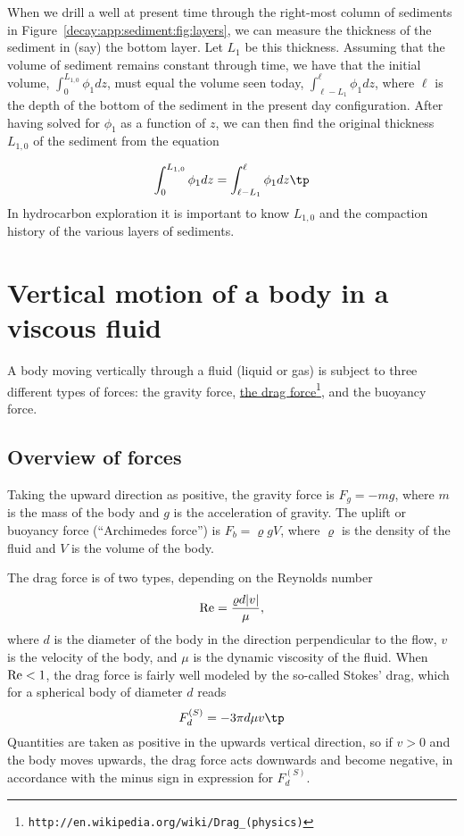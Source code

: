 \documentclass[graybox,sectrefs,envcountresetchap,open=right,final]{svmonodo}
\begin{document}
When we drill a well at present time through the right-most column of
sediments in Figure~\ref{decay:app:sediment:fig:layers}, we can measure
the thickness of the sediment in (say) the bottom layer. Let $L_1$ be
this thickness.  Assuming that the volume of sediment remains constant
through time, we have that the initial volume, $\int_0^{L_{1,0}}
\phi_1 dz$, must equal the volume seen today,
$\int_{\ell-L_1}^{\ell}\phi_1 dz$, where $\ell$ is the depth of the
bottom of the sediment in the present day configuration.  After having
solved for $\phi_1$ as a function of $z$, we can then find the
original thickness $L_{1,0}$ of the sediment from the equation

\[ \int_0^{L_{1,0}} \phi_1 dz = \int_{\ell-L_1}^{\ell}\phi_1 dz \tp \]
In hydrocarbon exploration it is important to know $L_{1,0}$ and the
compaction history of the various layers of sediments.

\section{Vertical motion of a body in a viscous fluid}
\label{decay:app:drag}


A body moving vertically through a fluid (liquid or gas) is subject to
three different types of forces: the gravity force, \href{{http://en.wikipedia.org/wiki/Drag_(physics)}}{the drag force}\footnote{\texttt{http://en.wikipedia.org/wiki/Drag\_(physics)}},
and the buoyancy force.

\subsection{Overview of forces}

Taking the upward direction as positive,
the gravity force is $F_g= -mg$, where $m$ is the mass of the body and
$g$ is the acceleration of gravity.
The uplift or buoyancy force (``Archimedes force'') is $F_b = \varrho gV$,
where $\varrho$ is the density of the fluid and
$V$ is the volume of the body.

The drag force is of two types, depending on the Reynolds number
\begin{equation}
\hbox{Re} = \frac{\varrho d|v|}{\mu},
\end{equation}
where $d$ is the diameter of the body in
the direction perpendicular to the flow, $v$ is the velocity of the
body, and $\mu$ is the dynamic viscosity of the fluid.
When $\hbox{Re} < 1$, the drag force is fairly well modeled by
the so-called Stokes' drag,
which for a spherical body of diameter $d$ reads
\begin{equation}
F_d^{(S)} = - 3\pi d\mu v
\tp
\end{equation}
Quantities are taken as positive in the upwards vertical direction, so
if $v>0$ and the body moves upwards, the drag force acts downwards and
become negative, in accordance with the minus sign in expression for
$F_d^{(S)}$.
\end{document}
